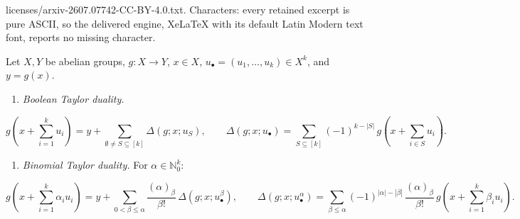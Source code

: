 \documentclass[10pt,a4paper]{amsart}
\newcommand{\IN}{\mathbb{N}} %
\newcommand{\tightlist}{\setlength{\itemsep}{0pt}\setlength{\parskip}{0pt}}
\begin{document}
licenses/arxiv-2607.07742-CC-BY-4.0.txt. Characters: every retained excerpt is pure ASCII, so the delivered engine, XeLaTeX with its default Latin Modern text font, reports no missing character.
\begin{proposition}

\label{prop:taylor-duality} Let \(X, Y\) be abelian groups,
\(g: X \to Y\), \(x \in X\), \(u_\bullet = (u_1, \dots, u_k) \in X^k\),
and \(y = g(x)\).

\begin{enumerate}
\def\labelenumi{\arabic{enumi})}
\tightlist
\item
  \emph{Boolean Taylor duality.}
\end{enumerate}

\[
  g(x + {\textstyle\sum_{i=1}^k} u_i) = y + \sum_{\emptyset \neq S \subseteq [k]} \Delta(g; x; u_S), \qquad \Delta(g; x; u_\bullet) = \sum_{S \subseteq [k]} (-1)^{k-|S|}\, g(x + {\textstyle\sum_{i \in S}} u_i).
\]

\begin{enumerate}
\def\labelenumi{\arabic{enumi})}
\setcounter{enumi}{1}
\tightlist
\item
  \emph{Binomial Taylor duality.} For \(\alpha \in \IN_0^k\):
\end{enumerate}

\[
  g(x + {\textstyle\sum_{i=1}^k} \alpha_i u_i) = y + \sum_{0 < \beta \leq \alpha} \frac{(\alpha)_\beta}{\beta!}\, \Delta(g; x; u_\bullet^\beta), \qquad \Delta(g; x; u_\bullet^\alpha) = \sum_{\beta \leq \alpha} (-1)^{|\alpha|-|\beta|}\, \frac{(\alpha)_\beta}{\beta!}\, g(x + {\textstyle\sum_{i=1}^k} \beta_i u_i).
\]

\end{proposition}
\end{document}
